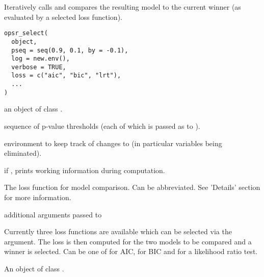 
%
\begin{Description}
Iteratively calls  and compares the resulting model to the
current winner (as evaluated by a selected loss function).
\end{Description}
%
\begin{Usage}
\begin{verbatim}
opsr_select(
  object,
  pseq = seq(0.9, 0.1, by = -0.1),
  log = new.env(),
  verbose = TRUE,
  loss = c("aic", "bic", "lrt"),
  ...
)
\end{verbatim}
\end{Usage}
%
\begin{Arguments}
\begin{ldescription}
\item[\code{object}] an object of class .

\item[\code{pseq}] sequence of p-value thresholds (each of which is passed as 
to ).

\item[\code{log}] environment to keep track of changes to  (in particular
variables being eliminated).

\item[\code{verbose}] if , prints working information during computation.

\item[\code{loss}] The loss function for model comparison. Can be abbreviated.
See 'Details' section for more information.

\item[\code{...}] additional arguments passed to 
\end{ldescription}
\end{Arguments}
%
\begin{Details}
Currently three loss functions are available which can be selected via the
 argument. The loss is then computed for the two models to be compared
and a winner is selected. Can be one of  for AIC,  for BIC and
 for a likelihood ratio test.
\end{Details}
%
\begin{Value}
An object of class .
\end{Value}
